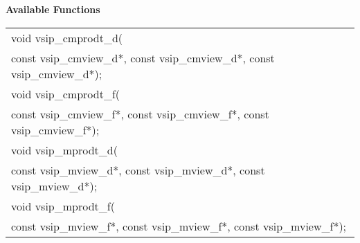 \\\cvsiplh
\\ \hspace*{.8cm} \vspace*{.1cm} \textbf{Available Functions }
\\ \hspace*{1.1cm} {
\ttfamily
\begin{tabular}[H]{l}
void vsip\_cmprodt\_d(\\*\hspace{.6cm}
    const vsip\_cmview\_d*, const vsip\_cmview\_d*, const vsip\_cmview\_d*);\\
void vsip\_cmprodt\_f(\\*\hspace{.6cm}
    const vsip\_cmview\_f*, const vsip\_cmview\_f*, const vsip\_cmview\_f*);\\
void vsip\_mprodt\_d(\\*\hspace{.6cm}
    const vsip\_mview\_d*, const vsip\_mview\_d*, const vsip\_mview\_d*);\\
void vsip\_mprodt\_f(\\*\hspace{.6cm}
    const vsip\_mview\_f*, const vsip\_mview\_f*, const vsip\_mview\_f*);\\
\end{tabular}
}
\\\pyjvsiph
{}
